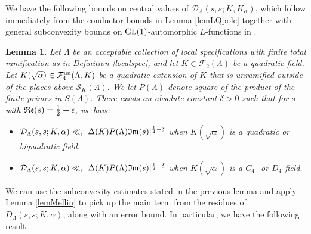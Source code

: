 \documentclass[10pt]{article}
\theoremstyle{plain}
\newtheorem{lemma}[thm]{Lemma}
\theoremstyle{definition}
\theoremstyle{remark}
\renewcommand{\Im}{\frak{Im}}
\renewcommand{\Re}{\frak{Re}}
\def\GL{{\rm GL}}
\def\un{{\rm un}}
\def\Disc{{\Delta}}
\def\cD{{\mathcal D}}
\def\cF{{\mathcal F}}
\def\cS{{\mathcal S}}
\begin{document}
We have the following bounds on central values of
$\cD_\Lambda(s,s;K,K_\alpha)$, which follow immediately from the
conductor bounds in Lemma \ref{lemLQpole} together with general
subconvexity bounds on $\GL(1)$-automorphic $L$-functions in
\cite{MR2653249}.

\begin{lemma}\label{lemcent}
Let $\Lambda$ be an acceptable collection of local 
specifications with finite total ramification as in Definition \ref{localspec}, and let $K \in
\cF_2(\Lambda)$ be a quadratic field. Let $K(\sqrt{\alpha}) \in
\cF_4^{\un}(\Lambda,K)$ be a quadratic extension of $K$ that is
unramified outside of the places above $\cS_K(\Lambda)$.  We let $P(\Lambda)$ denote square
of the product of the finite primes in $S(\Lambda)$. There exists an absolute constant $\delta>0$ such that
for $s$ with $\Re(s)=\frac12+\epsilon$, we have
\begin{itemize}
\item[{\rm (a)}] $\cD_\Lambda(s,s;K,\alpha)\ll_\epsilon
  |\Disc(K)P(\Lambda) \Im(s)|^{\frac14-\delta}$ when
  $K(\sqrt{\alpha})$ is a quadratic or biquadratic field.
\item[{\rm (b)}] $\cD_\Lambda(s,s;K,\alpha)\ll_\epsilon
  |\Disc(K)P(\Lambda) \Im(s)|^{\frac12-\delta}$ when
  $K(\sqrt{\alpha})$ is a $C_4$- or $D_4$-field.
\end{itemize}
\end{lemma}



We can use the subconvexity estimates stated in the previous lemma and apply Lemma \ref{lemMellin} to pick up the main term from the residues of $D_{\Lambda}(s,s;K,\alpha)$, along with an error bound. In particular, we have the following result.
\end{document}
